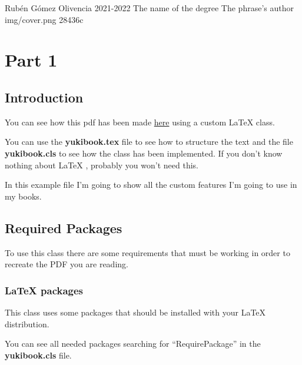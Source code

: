 \documentclass{\ClassPath/yukibook}
\begin{document}
  {Rubén Gómez Olivencia}  %
  {2021-2022}    %
  {The name \linebreak of the degree} %
  {} %
  {The phrase's author} %
  {img/cover.png}
  {28436c} %

\coverpage
\licensepage

\tableofcontents



\part{Part 1}

\chapter{Introduction}
You can see how this pdf has been made \href{https://github.com/yuki/yukibook.cls}{here} using a custom \LaTeX{}  class.

You can use the \textbf{yukibook.tex} file to see how to structure the text and the file \textbf{yukibook.cls} to see how the class has been implemented. If you don't know nothing about \LaTeX{} , probably you won't need this.

In this example file I'm going to show all the custom features I'm going to use in my books.

\chapter{Required Packages}
To use this class there are some requirements that must be working in order to recreate the PDF you are reading.
\section{\LaTeX{} packages}

This class uses some packages that should be installed with your \LaTeX{} distribution.

You can see all needed packages searching for “RequirePackage” in the \textbf{yukibook.cls} file.
\end{document}
